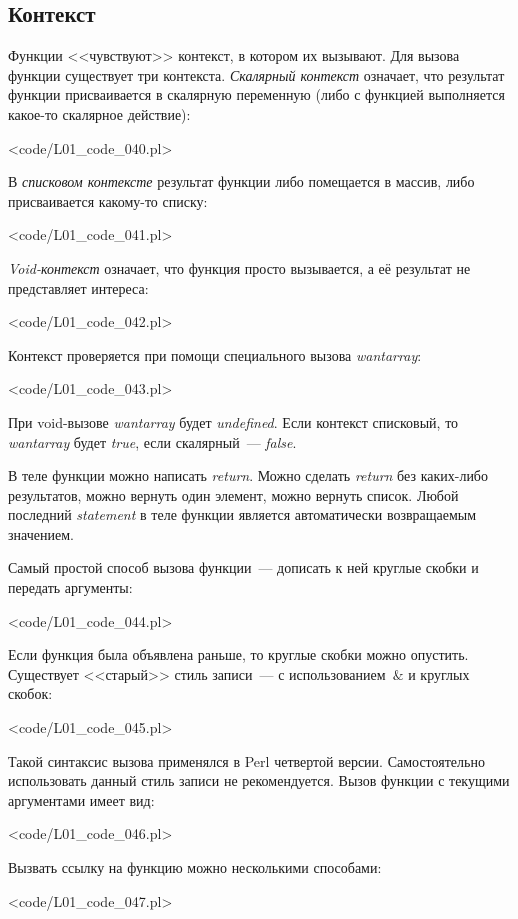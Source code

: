 \subsection{Контекст}
Функции <<чувствуют>> контекст, в котором их вызывают.
Для вызова функции существует три контекста.
\textit{Скалярный контекст} означает, что результат функции присваивается в скалярную переменную (либо с функцией выполняется какое-то скалярное действие):

\pr<code/L01_code_040.pl>

В \textit{списковом контексте} результат функции либо помещается в массив, либо присваивается какому-то списку:

\pr<code/L01_code_041.pl>

\textit{Void-контекст} означает, что функция просто вызывается, а её результат не представляет интереса:

\pr<code/L01_code_042.pl>

Контекст проверяется при помощи специального вызова \textit{wantarray}:

\pr<code/L01_code_043.pl>

При void-вызове \textit{wantarray} будет \textit{undefined}.
Если контекст списковый, то \textit{wantarray} будет \textit{true}, если скалярный~--- \textit{false}.

В теле функции можно написать \textit{return}.
Можно сделать \textit{return} без каких-либо результатов, можно вернуть один элемент, можно вернуть список.
Любой последний \textit{statement} в теле функции является автоматически возвращаемым значением.

Самый простой способ вызова функции~--- дописать к ней круглые скобки и передать аргументы:

\pr<code/L01_code_044.pl>

Если функция была объявлена раньше, то круглые скобки можно опустить.
Существует <<старый>> стиль записи~--- с использованием~$\&$ и круглых скобок:

\pr<code/L01_code_045.pl>

Такой синтаксис вызова применялся в Perl четвертой версии.
Самостоятельно использовать данный стиль записи не рекомендуется.
Вызов функции с текущими аргументами имеет вид:

\pr<code/L01_code_046.pl>

Вызвать ссылку на функцию можно несколькими способами:

\pr<code/L01_code_047.pl>


